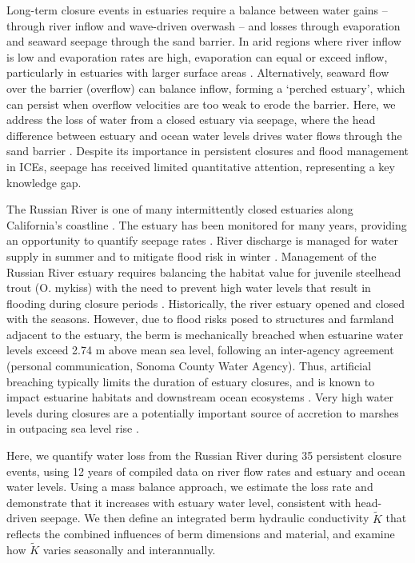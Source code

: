 \documentclass[preprint,12pt,authoryear]{elsarticle}
\begin{document}
Long-term closure events in estuaries require a balance between water gains --through river inflow and wave-driven overwash -- and losses through evaporation and seaward seepage through the sand barrier. 
In arid regions where river inflow is low and evaporation rates are high, evaporation can equal or exceed inflow, particularly in estuaries with larger surface areas \citep{largier2023recognizing}. 
Alternatively, seaward flow over the barrier (overflow) can balance inflow, forming a `perched estuary', which can persist when overflow velocities are too weak to erode the barrier. Here, we address the loss of water from a closed estuary via seepage, where  the head difference between estuary and ocean water levels drives water flows through the sand barrier \citep{perissinotto2010temporarily}. 
 Despite its importance in persistent closures and flood management in ICEs, seepage has received limited quantitative attention, representing a key knowledge gap. 


The Russian River is one of many intermittently closed estuaries along California's coastline \citep{johnson1973characteristics, goodwin1996predicting, heady2015assessing}. The estuary has been monitored for many years, providing an opportunity to quantify seepage rates \citep{largier20205}. River discharge is managed for water supply in summer and to mitigate flood risk in winter \citep{harassment2021russian}.  Management of the Russian River estuary requires balancing the habitat value for juvenile steelhead trout (O. mykiss) with the need to prevent high water levels that result in flooding during closure periods \citep{largier20205}. Historically, the river estuary opened and closed with the seasons.  However, due to flood risks posed to structures and farmland adjacent to the estuary, the berm is mechanically breached when estuarine water levels exceed 2.74 m above mean sea level, following an inter-agency agreement (personal communication, Sonoma County Water Agency). Thus, artificial breaching typically limits the duration of estuary closures, and is known to impact estuarine habitats and downstream ocean ecosystems  \citep{largier2023recognizing, slinger2017modes}.  Very high water levels during closures are a potentially important source of accretion to marshes in outpacing sea level rise \citep{thorne2021wetlands}.
  

Here, we quantify water loss from the Russian River during 35 persistent closure events, using 12 years of compiled data on river flow rates and estuary and ocean water levels. Using a mass balance approach, we estimate the loss rate and demonstrate that it increases with estuary water level, consistent with head-driven seepage. We then define an integrated berm hydraulic conductivity $\tilde K$ that reflects the combined influences of berm dimensions and material, and examine how $\tilde K$ varies seasonally and interannually.
\end{document}

